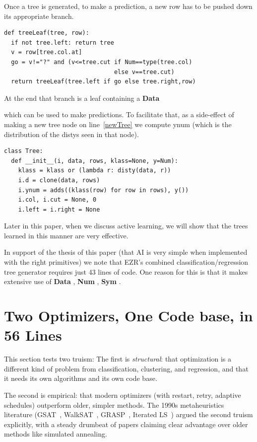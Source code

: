 \documentclass[AMA,STIX2COL]{WileyNJDv5}
\newcommand{\cls}[1]{%
  \setlength{\fboxsep}{1.5pt}%
  \colorbox{clsbg}{\sffamily\bfseries{#1}}%
}
\begin{document}
 Once a tree is generated,
 to make a prediction, a new row has to be pushed down its appropriate
branch. 
\begin{lstlisting}
def treeLeaf(tree, row): 
  if not tree.left: return tree
  v = row[tree.col.at]
  go = v!="?" and (v<=tree.cut if Num==type(tree.col) 
                               else v==tree.cut)
  return treeLeaf(tree.left if go else tree.right,row)
\end{lstlisting}
At the end that branch is a leaf containing a \cls{Data}
which can be used to make predictions.
To facilitate that, as a side-effect of making a new tree node on line~\ref{newTree}
we compute \textsf{ynum} (which is the distribution of 
the \textsf{disty}s seen in that node).
\begin{lstlisting}
class Tree:
  def __init__(i, data, rows, klass=None, y=Num):
    klass = klass or (lambda r: disty(data, r))
    i.d = clone(data, rows)
    i.ynum = adds((klass(row) for row in rows), y())
    i.col, i.cut = None, 0
    i.left = i.right = None
\end{lstlisting}
 Later in this paper, when we discuss active learning, we will show
 that the trees learned in this manner are very effective.
 
  In support of the thesis of this paper
  (that AI is very simple
  when implemented with the right primitives) we note that EZR's
  combined classification/regression tree  generator
  requires just 43 lines of code.
One reason for this is that it makes extensive use of 
\cls{Data}, \cls{Num}, \cls{Sym}.
  
\section{Two Optimizers, One Code base, in 56 Lines}\label{sec:opt}

This section tests two truism:
The first is {\em structural}: that
optimization is a different kind of problem from classification,
clustering, and regression, and that it needs its own algorithms
and its own code base. 

The second is {empirical}: that modern
optimizers (with restart, retry, adaptive schedules) outperform
older, simpler methods. The 1990s metaheuristics literature
(GSAT~\cite{gsat}, WalkSAT~\cite{walksat}, GRASP~\cite{grasp},
Iterated LS~\cite{ils}) argued the second truism explicitly, with
a steady drumbeat of papers claiming clear advantage over older
methods like simulated annealing. 
\end{document}
